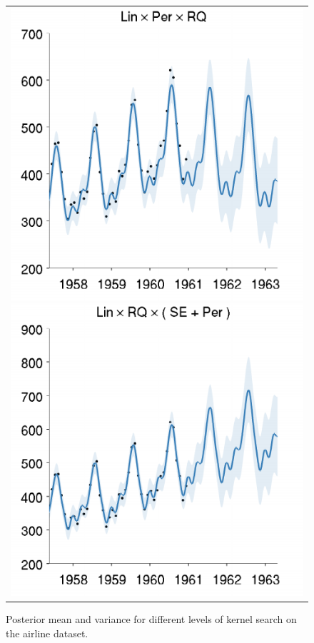\documentclass[twoside]{article}
\begin{document}
\begin{figure}[h!]
\begin{tabular}{c}
\hspace{-1cm} \includegraphics[width=\wag,height=\hag]{../figures/decomposition/01-airline-s_max_level_2/01-airline-s_all_small} 
\hspace{-1cm} \includegraphics[width=\wag,height=\hag]{../figures/decomposition/01-airline-s_max_level_3/01-airline-s_all_small}
\end{tabular}
\caption{Posterior mean and variance for different levels of kernel search on the airline dataset.}
\label{fig:airline_grow}
\end{figure}
\end{document}
